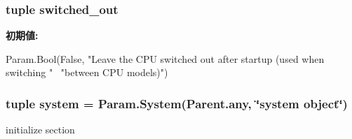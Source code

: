 \label{classBaseCPU_a15fdecad084e8c7e04ac559e4636c87d}
\hypertarget{classBaseCPU_a121f751814e1a758b12f22303623a3f2}{
\subsubsection[{switched\_\-out}]{\setlength{\rightskip}{0pt plus 5cm}tuple {\bf switched\_\-out}}}
\label{classBaseCPU_a121f751814e1a758b12f22303623a3f2}
{\bfseries 初期値:}
\begin{DoxyCode}
Param.Bool(False,
        "Leave the CPU switched out after startup (used when switching " \
        "between CPU models)")
\end{DoxyCode}
\hypertarget{classBaseCPU_ab737471139f5a296e5b26e8a0e1b0744}{
\subsubsection[{system}]{\setlength{\rightskip}{0pt plus 5cm}tuple {\bf system} = Param.System(Parent.any, \char`\"{}system object\char`\"{})}}
\label{classBaseCPU_ab737471139f5a296e5b26e8a0e1b0744}


initialize section 


